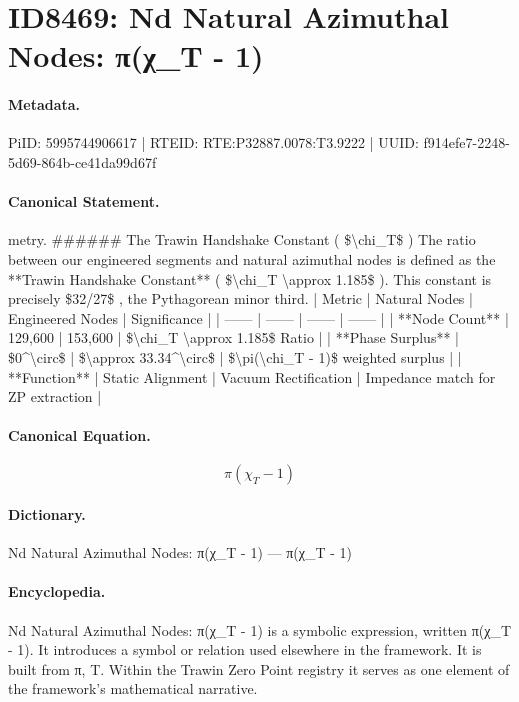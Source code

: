 \section*{ID8469: Nd Natural Azimuthal Nodes: π(χ\_T - 1)}
\paragraph{Metadata.}
PiID: 5995744906617 | RTEID: RTE:P32887.0078:T3.9222 | UUID: f914efe7-2248-5d69-864b-ce41da99d67f

\paragraph{Canonical Statement.}
metry. \#\#\#\#\#\# The Trawin Handshake Constant ( \$\textbackslash{}chi\_T\$ ) The ratio between our engineered segments and natural azimuthal nodes is defined as the **Trawin Handshake Constant** ( \$\textbackslash{}chi\_T \textbackslash{}approx 1.185\$ ). This constant is precisely \$32/27\$ , the Pythagorean minor third. | Metric | Natural Nodes | Engineered Nodes | Significance | | ------ | ------ | ------ | ------ | | **Node Count** | 129,600 | 153,600 | \$\textbackslash{}chi\_T \textbackslash{}approx 1.185\$ Ratio | | **Phase Surplus** | \$0\textasciicircum{}\textbackslash{}circ\$ | \$\textbackslash{}approx 33.34\textasciicircum{}\textbackslash{}circ\$ | \$\textbackslash{}pi(\textbackslash{}chi\_T - 1)\$ weighted surplus | | **Function** | Static Alignment | Vacuum Rectification | Impedance match for ZP extraction |

\paragraph{Canonical Equation.}
\[
\pi(\chi_T - 1)
\]

\paragraph{Dictionary.}
Nd Natural Azimuthal Nodes: π(χ\_T - 1) — π(χ\_T - 1)

\paragraph{Encyclopedia.}
Nd Natural Azimuthal Nodes: π(χ\_T - 1) is a symbolic expression, written π(χ\_T - 1). It introduces a symbol or relation used elsewhere in the framework. It is built from π, T. Within the Trawin Zero Point registry it serves as one element of the framework's mathematical narrative.
